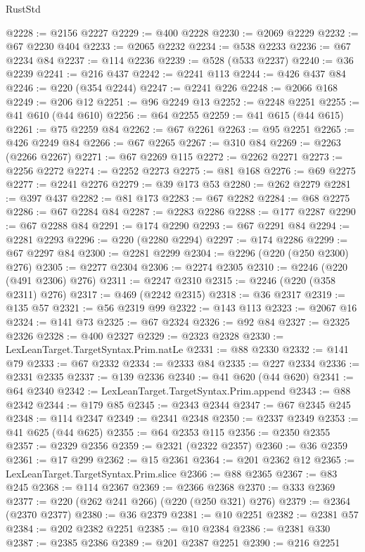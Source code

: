 \begin{lexlean}{RustStd}
\begin{coremodule}
@2228 := @2156 @2227
@2229 := @400 @2228
@2230 := @2069 @2229
@2232 := @67 @2230 @404
@2233 := @2065 @2232
@2234 := @538 @2233
@2236 := @67 @2234 @84
@2237 := @114 @2236
@2239 := @528 (@533 @2237)
@2240 := @36 @2239
@2241 := @216 @437
@2242 := @2241 @113
@2244 := @426 @437 @84
@2246 := @220 (@354 @2244)
@2247 := @2241 @226
@2248 := @2066 @168
@2249 := @206 @12
@2251 := @96 @2249 @13
@2252 := @2248 @2251
@2255 := @41 @610 (@44 @610)
@2256 := @64 @2255
@2259 := @41 @615 (@44 @615)
@2261 := @75 @2259 @84
@2262 := @67 @2261
@2263 := @95 @2251
@2265 := @426 @2249 @84
@2266 := @67 @2265
@2267 := @310 @84
@2269 := @2263 (@2266 @2267)
@2271 := @67 @2269 @115
@2272 := @2262 @2271
@2273 := @2256 @2272
@2274 := @2252 @2273
@2275 := @81 @168
@2276 := @69 @2275
@2277 := @2241 @2276
@2279 := @39 @173 @53
@2280 := @262 @2279
@2281 := @397 @437
@2282 := @81 @173
@2283 := @67 @2282
@2284 := @68 @2275
@2286 := @67 @2284 @84
@2287 := @2283 @2286
@2288 := @177 @2287
@2290 := @67 @2288 @84
@2291 := @174 @2290
@2293 := @67 @2291 @84
@2294 := @2281 @2293
@2296 := @220 (@2280 @2294)
@2297 := @174 @2286
@2299 := @67 @2297 @84
@2300 := @2281 @2299
@2304 := @2296 (@220 (@250 @2300) @276)
@2305 := @2277 @2304
@2306 := @2274 @2305
@2310 := @2246 (@220 (@491 @2306) @276)
@2311 := @2247 @2310
@2315 := @2246 (@220 (@358 @2311) @276)
@2317 := @469 (@2242 @2315)
@2318 := @36 @2317
@2319 := @135 @57
@2321 := @56 @2319 @99
@2322 := @143 @113
@2323 := @2067 @16
@2324 := @141 @73
@2325 := @67 @2324
@2326 := @92 @84
@2327 := @2325 @2326
@2328 := @400 @2327
@2329 := @2323 @2328
@2330 := LexLeanTarget.TargetSyntax.Prim.natLe
@2331 := @88 @2330
@2332 := @141 @79
@2333 := @67 @2332
@2334 := @2333 @84
@2335 := @227 @2334
@2336 := @2331 @2335
@2337 := @139 @2336
@2340 := @41 @620 (@44 @620)
@2341 := @64 @2340
@2342 := LexLeanTarget.TargetSyntax.Prim.append
@2343 := @88 @2342
@2344 := @179 @85
@2345 := @2343 @2344
@2347 := @67 @2345 @245
@2348 := @114 @2347
@2349 := @2341 @2348
@2350 := @2337 @2349
@2353 := @41 @625 (@44 @625)
@2355 := @64 @2353 @115
@2356 := @2350 @2355
@2357 := @2329 @2356
@2359 := @2321 (@2322 @2357)
@2360 := @36 @2359
@2361 := @17 @299
@2362 := @15 @2361
@2364 := @201 @2362 @12
@2365 := LexLeanTarget.TargetSyntax.Prim.slice
@2366 := @88 @2365
@2367 := @83 @245
@2368 := @114 @2367
@2369 := @2366 @2368
@2370 := @333 @2369
@2377 := @220 (@262 @241 @266) (@220 (@250 @321) @276)
@2379 := @2364 (@2370 @2377)
@2380 := @36 @2379
@2381 := @10 @2251
@2382 := @2381 @57
@2384 := @202 @2382 @2251
@2385 := @10 @2384
@2386 := @2381 @330
@2387 := @2385 @2386
@2389 := @201 @2387 @2251
@2390 := @216 @2251

\end{coremodule}
\end{lexlean}
